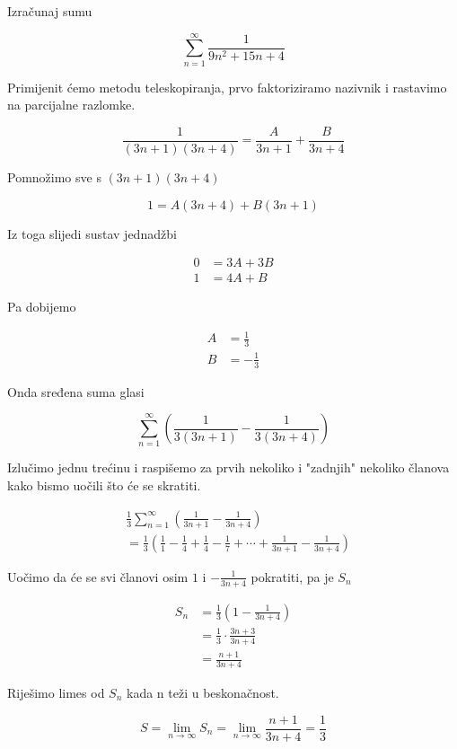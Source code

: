\documentclass{article}
\begin{document}
	Izračunaj sumu
	
	\[ \sum\limits_{n=1}^\infty \frac{1}{9n^2 + 15n + 4} \]
	
	Primijenit ćemo metodu teleskopiranja, prvo faktoriziramo nazivnik i rastavimo na parcijalne razlomke.
	
	\[ \frac{1}{(3n + 1)(3n + 4)} = \frac{A}{3n + 1} + \frac{B}{3n + 4} \]
	
	Pomnožimo sve s \( (3n + 1)(3n + 4) \)
	
	\[ 1 = A(3n + 4) + B(3n + 1) \]
	
	Iz toga slijedi sustav jednadžbi
	
	\begin{align*}
		0 &= 3A + 3B \\
		1 &= 4A + B
	\end{align*}
	
	Pa dobijemo
	
	\begin{align*}
		A &= \frac{1}{3} \\
		B &= - \frac{1}{3}
	\end{align*}
	
	Onda sređena suma glasi
	
	\[ \sum\limits_{n=1}^\infty \left ( \frac{1}{3(3n + 1)} - \frac{1}{3(3n + 4)} \right ) \]
	
	Izlučimo jednu trećinu i raspišemo za prvih nekoliko i "zadnjih" nekoliko članova kako bismo uočili što će se skratiti.
	
	\begin{align*}
		& \frac{1}{3} \sum\limits_{n=1}^\infty \left ( \frac{1}{3n + 1} - \frac{1}{3n + 4} \right ) \\ 
		&= \frac{1}{3} \left ( \frac{1}{1} - \frac{1}{4} + \frac{1}{4} - \frac{1}{7} + \cdots + \frac{1}{3n + 1} - \frac{1}{3n + 4} \right )
	\end{align*}
	
	Uočimo da će se svi članovi osim \( 1 \) i \( - \frac{1}{3n + 4} \) pokratiti, pa je \( S_n \)
	
	
	\begin{align*}
		S_n &= \frac{1}{3} \left ( 1 - \frac{1}{3n + 4} \right ) \\
		&= \frac{1}{3} \cdot \frac{3n + 3}{3n + 4} \\
		&= \frac{n + 1}{3n + 4}
	\end{align*}		
	
	Riješimo limes od \( S_n \) kada n teži u beskonačnost.
	
	\[ S = \lim_{n \to \infty} S_n = \lim_{n \to \infty} \frac{n + 1}{3n + 4} = \frac{1}{3} \]
\end{document}
